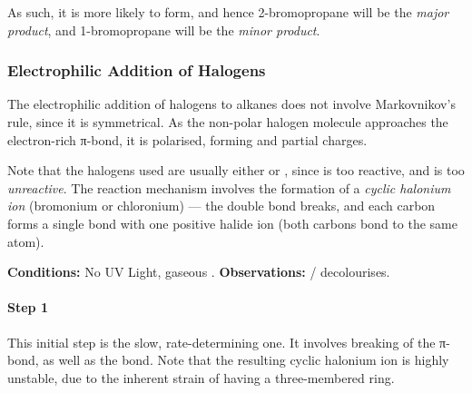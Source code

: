 			As such, it is more likely to form, and hence 2-bromopropane will be the \textit{major product}, and
			1-bromopropane will be the \textit{minor product}.



		\pagebreak
		\subsubsection{Electrophilic Addition of Halogens}

			The electrophilic addition of halogens to alkanes does not involve Markovnikov's rule, since it is symmetrical.
			As the non-polar halogen molecule approaches the electron-rich π-bond, it is polarised, forming \deltap and \deltam partial
			charges.

			Note that the halogens used are usually either  or , since  is too reactive, and
			 is too \textit{unreactive}. The reaction mechanism involves the formation of a \textit{cyclic halonium ion}
			(bromonium or chloronium) –– the double bond breaks, and each carbon forms a single bond with one positive halide ion
			(both carbons bond to the same atom).

			\vspace{1.5em}

			\vbox{\textbf{Conditions:}	\tabto{35mm}No UV Light, gaseous .}	%
			\vbox{\textbf{Observations:}\tabto{35mm}  /   decolourises.}



			\paragraph{Step 1}

			This initial step is the slow, rate-determining one. It involves breaking of the π-bond, as well as the  bond.
			Note that the resulting cyclic halonium ion is highly unstable, due to the inherent strain of having a
			three-membered ring.




